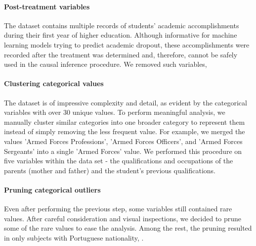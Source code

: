 \documentclass[11pt]{article}
\newcommand{\gur}[1]{{\color{teal}{Gur: #1}}}
\begin{document}
\paragraph{Post-treatment variables} The dataset contains multiple records of students' academic accomplishments during their first year of higher education. Although informative for machine learning models trying to predict academic dropout, these accomplishments were recorded after the treatment was determined and, therefore, cannot be safely used in the causal inference procedure. We removed such variables, 

\paragraph{Clustering categorical values} The dataset is of impressive complexity and detail, as evident by the categorical variables with over 30 unique values. To perform meaningful analysis, we manually cluster similar categories into one broader category to represent them instead of simply removing the less frequent value. For example, we merged the values 'Armed Forces Professions', 'Armed Forces Officers', and 'Armed Forces Sergeants' into a single 'Armed Forces' value. We performed this procedure on five variables within the data set - the qualifications and occupations of the parents (mother and father) and the student's previous qualifications. 

\paragraph{Pruning categorical outliers} Even after performing the previous step, some variables still contained rare values. After careful consideration and visual inspections, we decided to prune some of the rare values to ease the analysis. Among the rest, the pruning resulted in only subjects with Portuguese nationality, \gur{detail here more}.


\end{document}
